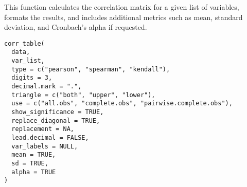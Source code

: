 \documentclass[a4paper]{book}
\begin{document}
%
\begin{Description}
This function calculates the correlation matrix for a given list of variables,
formats the results, and includes additional metrics such as mean, standard deviation,
and Cronbach's alpha if requested.
\end{Description}
%
\begin{Usage}
\begin{verbatim}
corr_table(
  data,
  var_list,
  type = c("pearson", "spearman", "kendall"),
  digits = 3,
  decimal.mark = ".",
  triangle = c("both", "upper", "lower"),
  use = c("all.obs", "complete.obs", "pairwise.complete.obs"),
  show_significance = TRUE,
  replace_diagonal = TRUE,
  replacement = NA,
  lead.decimal = FALSE,
  var_labels = NULL,
  mean = TRUE,
  sd = TRUE,
  alpha = TRUE
)
\end{verbatim}
\end{Usage}
%
\end{document}

